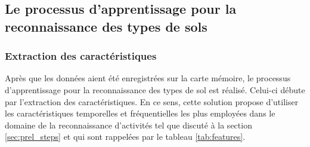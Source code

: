 \subsection{Le processus d'apprentissage pour la reconnaissance des types de sols}

\subsubsection{Extraction des caractéristiques}

Après que les données aient été enregistrées sur la carte mémoire, le processus d'apprentissage pour la reconnaissance des types de sol est réalisé. Celui-ci débute par l'extraction des caractéristiques. En ce sens, cette solution propose d'utiliser les caractéristiques temporelles et fréquentielles les plus employées dans le domaine de la reconnaissance d'activités tel que discuté à la section \ref{sec:prel_steps} et qui sont rappelées par le tableau \ref{tab:features}.

